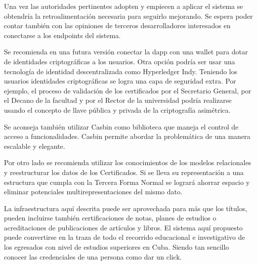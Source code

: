 \begin{recomendations}
Una vez las autoridades pertinentes adopten y empiecen a aplicar el sistema se obtendría la retroalimentación necesaria para seguirlo mejorando. Se espera poder contar también con las opiniones de terceros desarrolladores interesados en conectarse a los endpoints del sistema.

Se recomienda en una futura versión conectar la dapp con una wallet para dotar de identidades criptográficas a los usuarios.
Otra opción podría ser usar una tecnología de identidad descentralizada como Hyperledger Indy. Teniendo los usuarios identidades criptográficas se logra una capa de seguridad extra. Por ejemplo, el proceso de validación de los certificados por el Secretario General, por el Decano de la facultad y por el Rector de la universidad podría realizarse usando el concepto de llave pública y privada de la criptografía asimétrica.

Se aconseja también utilizar Casbin como biblioteca que maneja el control de acceso a funcionalidades. Casbin permite abordar la problemática de una manera escalable y elegante.

Por otro lado se recomienda utilizar los conocimientos de los modelos relacionales y reestructurar los datos de los Certificados. Si se lleva su representación a una estructura que cumpla con la Tercera Forma Normal se logrará ahorrar espacio y eliminar potenciales multirepresentaciones del mismo dato.

La infraestructura aquí descrita puede ser aprovechada para más que los títulos, pueden incluirse también certificaciones de notas, planes de estudios o acreditaciones de publicaciones de artículos y libros. El sistema aquí propuesto puede convertirse en la traza de todo el recorrido educacional e investigativo de los egresados con nivel de estudios superiores en Cuba. Siendo tan sencillo conocer las credenciales de una persona como dar un click.
\end{recomendations}
